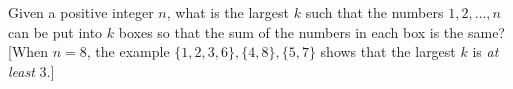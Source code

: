 Given a positive integer $n$, what is the largest $k$ such that the
numbers $1,2,\dots,n$ can be put into $k$ boxes so that the sum of the numbers
in each box is the same? [When $n=8$, the example $\{1,2,3,6\}, \{4,8\}, \{5,7\}$
shows that the largest $k$ is \emph{at least} 3.]
